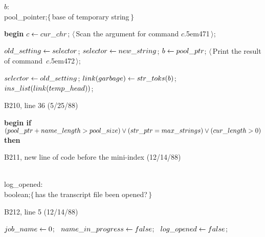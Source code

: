\ninepoint\noindent\kern20pt
$b$: \\{pool\_pointer};\quad$\{\,$base of temporary string$\,\}$\par
\noindent\kern10pt
{\bf begin} $c\gets\\{cur\_chr}$;
 $\langle\,$Scan the argument for command $c${\eightrm\kern.5em471}$\,\rangle$;
\par\noindent\kern10pt
$\\{old\_setting}\gets\\{selector}$;
$\\{selector}\gets\\{new\_string}$; $b\gets\\{pool\_ptr}$;
$\langle\,$Print the result of command~$c${\eightrm\kern.5em472}$\,\rangle$;
\par\noindent\kern10pt
$\\{selector}\gets\\{old\_setting}$;
$\\{link}(\\{garbage})\gets\\{str\_toks}(b)$;
$\\{ins\_list}(\\{link}(\\{temp\_head}))$;

\bugonpage B210, line 36 (5/25/88)

\ninepoint\noindent\kern10pt
{\bf begin if} $(\\{pool\_ptr}+\\{name\_length}>\\{pool\_size})
 \lor(\\{str\_ptr}=\\{max\_strings})\lor(\\{cur\_length}>0)$ {\bf then}

\bugonpage B211, new line of code before the mini-index (12/14/88)

\ninepoint\noindent
\\{log\_opened}: \\{boolean};\quad$\{\,$has the transcript file been opened?$\,\}$

\bugonpage B212, line 5 (12/14/88)

\ninepoint\noindent\kern10pt
$\\{job\_name}\gets0$; \ $\\{name\_in\_progress}\gets\\{false}$; \
$\\{log\_opened}\gets\\{false}$;

